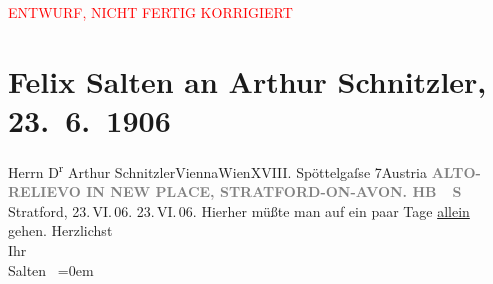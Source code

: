 
\begin{center}
            \textcolor{red}{ENTWURF, NICHT FERTIG KORRIGIERT}
                      \end{center}
            
         \renewcommand{\erwaehnteOrte}{Orte: Edmund-Weiß-Gasse, Stratford-upon-Avon, Wien, Österreich}
         \renewcommand{\erwaehnteWerke}{Werke: Shakespeare Monument}
               \section[Felix Salten an Arthur Schnitzler, 23. 6. 1906]{ Felix Salten an Arthur Schnitzler, 23. 6. 1906}\nopagebreak{}\rehead{ }\begin{ledgroupsized}[t]{13cm}\normalsize\beginnumbering \toendnotes[C]{\smallbreak\pagebreak[2]} 
\pstart{}{\pb}Herrn D\textsuperscript{r} Arthur Schnitzler\pend{}\pstart{}ViennaWien\pend{}\pstart{}XVIII. Spöttelgaſse 7\pend{}\pstart{}Austria\pend{}{\bigskip}\pstart
           \noindent{}\centering{}{\pb}\textcolor{gray}{\textbf{ALTO-RELIEVO IN NEW PLACE, STRATFORD-ON-AVON. HB {\kaufmannsund} S}}\pend
           \pstart
           \centering{}{\pb}Stratford, 23. VI. 06.
                     23. VI. 06.\pend
           \pstart
           Hierher müßte man auf ein paar Tage \uline{allein} gehen.\pend
           \pstart
           Herzlichst {\\[\baselineskip]}Ihr {\\[\baselineskip]}\spacefill\mbox{Salten }\pend
           \leftskip=0em{}
         
         \endnumbering{}\end{ledgroupsized}\begin{anhang}\end{anhang}\newcommand{\dateiname}{L03428}\newcommand{\titel}{Felix Salten an Arthur Schnitzler, 23. 6. 1906}\newcommand{\editorInnen}{Martin Anton Müller und Laura Untner}
      
